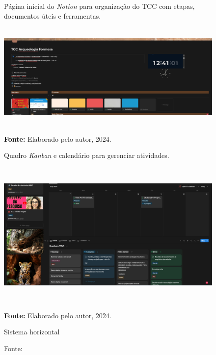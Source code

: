 {    \begin{figure}[H]
        \centering
        \caption{ Página inicial do \textit{Notion} para organização do TCC com etapas, \\ documentos úteis e ferramentas. \\
        \includegraphics[height=6cm, keepaspectratio]{img/Notion/pagina inicial.png}
            \textbf{Fonte:} Elaborado pelo autor, 2024.}
        \label{fig:notion inicial}
    \end{figure}
    
    \begin{figure}[H]
        \centering
        \caption{ Quadro \textit{Kanban} e calendário para gerenciar atividades. \\
        \label{fig:kanban notion}
        \includegraphics[height=8cm, keepaspectratio]{img/Notion/kanban.png}
            \textbf{Fonte:} Elaborado pelo autor, 2024.}
    \end{figure}

    \begin{figure}[H]
\centering
\caption{Sistema horizontal}  
\centering
\label{fig:horizontal}
\caption*{Fonte: \cite{de2004astronomia}}
\end{figure}
    
}
